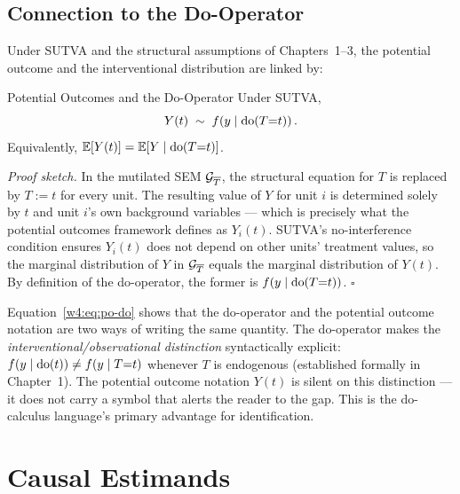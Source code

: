 \documentclass[master.tex]{subfiles}
\begin{document}
\subsection{Connection to the Do-Operator}

Under SUTVA and the structural assumptions of Chapters~1--3, the potential
outcome and the interventional distribution are linked by:

\begin{prop}{Potential Outcomes and the Do-Operator}
\label{w4:prop:po-do}
Under SUTVA,
\begin{equation}
  Y(t) \;\sim\; f\!\left(y \mid \mathrm{do}(T{=}t)\right).
  \label{w4:eq:po-do}
\end{equation}
Equivalently, $\mathbb{E}[Y(t)] = \mathbb{E}[Y \mid \mathrm{do}(T{=}t)]$.
\end{prop}

\noindent\textit{Proof sketch.}
In the mutilated SEM $\mathcal{G}_{\overline{T}}$, the structural equation for
$T$ is replaced by $T := t$ for every unit.  The resulting value of $Y$ for
unit $i$ is determined solely by $t$ and unit $i$'s own background variables
--- which is precisely what the potential outcomes framework defines as
$Y_i(t)$.  SUTVA's no-interference condition ensures $Y_i(t)$ does not
depend on other units' treatment values, so the marginal distribution of $Y$
in $\mathcal{G}_{\overline{T}}$ equals the marginal distribution of $Y(t)$.  By
definition of the do-operator, the former is $f(y \mid \mathrm{do}(T{=}t))$.
\hfill$\square$

\begin{remark}
Equation~\eqref{w4:eq:po-do} shows that the do-operator and the potential
outcome notation are two ways of writing the same quantity.  The
do-operator makes the \emph{interventional/observational distinction}
syntactically explicit: $f(y \mid \mathrm{do}(t)) \neq f(y \mid T{=}t)$
whenever $T$ is endogenous (established formally in Chapter~1).
The potential outcome notation $Y(t)$ is silent on this distinction ---
it does not carry a symbol that alerts the reader to the gap.  This is the
do-calculus language's primary advantage for identification.
\end{remark}

\section{Causal Estimands}
\label{w4:sec:estimands}
\end{document}
